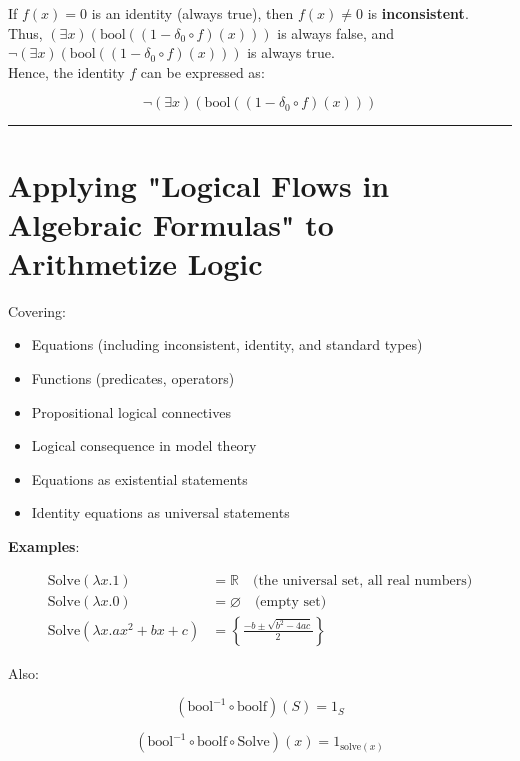 \documentclass{article}
\begin{document}
If $f(x) = 0$ is an identity (always true), then $f(x) \neq 0$ is \textbf{inconsistent}.\\

Thus, $(\exists x)(\mathrm{bool}((1 - \delta_0 \circ f)(x)))$ is always false, and\\
$\neg (\exists x)(\mathrm{bool}((1 - \delta_0 \circ f)(x)))$ is always true.\\

Hence, the identity $f$ can be expressed as:

\[
\neg (\exists x)(\mathrm{bool}((1 - \delta_0 \circ f)(x)))
\]

\bigskip
\hrule
\bigskip

\section*{Applying "Logical Flows in Algebraic Formulas" to Arithmetize Logic}

Covering:

\begin{itemize}
    \item Equations (including inconsistent, identity, and standard types)
    \item Functions (predicates, operators)
    \item Propositional logical connectives
    \item Logical consequence in model theory
    \item Equations as existential statements
    \item Identity equations as universal statements
\end{itemize}

\bigskip

\textbf{Examples}:

\begin{align*}
\mathrm{Solve}(\lambda x . 1) &= \mathbb{R} \quad \text{(the universal set, all real numbers)} \\
\mathrm{Solve}(\lambda x . 0) &= \varnothing \quad \text{(empty set)} \\
\mathrm{Solve}(\lambda x . a x^2 + b x + c) &= \left\{ \frac{-b \pm \sqrt{b^2 - 4ac}}{2} \right\}
\end{align*}

Also:

\[
(\mathrm{bool}^{-1} \circ \mathrm{boolf})(S) = 1_S
\]

\[
(\mathrm{bool}^{-1} \circ \mathrm{boolf} \circ \mathrm{Solve})(x) = 1_{\mathrm{solve}(x)}
\]
\end{document}

